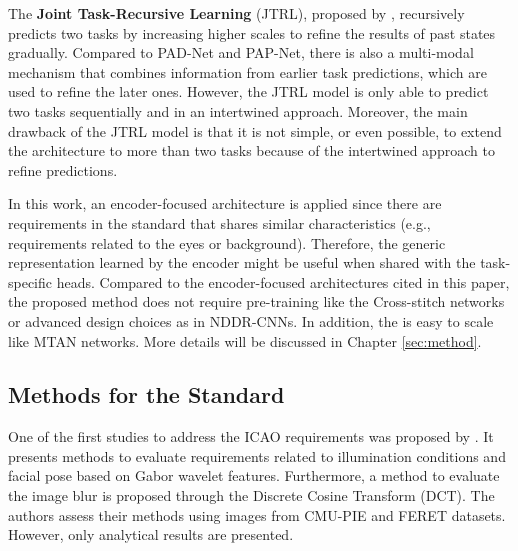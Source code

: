 The \textbf{Joint Task-Recursive Learning} (JTRL), proposed by \cite{zhang2018joint}, recursively predicts two tasks by increasing higher scales to refine the results of past states gradually. Compared to PAD-Net and PAP-Net, there is also a multi-modal mechanism that combines information from earlier task predictions, which are used to refine the later ones. However, the JTRL model is only able to predict two tasks sequentially and in an intertwined approach. Moreover, the main drawback of the JTRL model is that it is not simple, or even possible, to extend the architecture to more than two tasks because of the intertwined approach to refine predictions.

In this work, an encoder-focused architecture is applied since there are requirements in the \icao standard that shares similar characteristics (e.g., requirements related to the eyes or background). Therefore, the generic representation learned by the encoder might be useful when shared with the task-specific heads. Compared to the encoder-focused architectures cited in this paper, the proposed method does not require pre-training like the Cross-stitch networks or advanced design choices as in NDDR-CNNs. In addition, the \methodname is easy to scale like MTAN networks. More details will be discussed in Chapter \ref{sec:method}.

\subsection{Methods for the \icao Standard}

One of the first studies to address the ICAO requirements was proposed by \citet{sang2009face}. It presents methods to evaluate requirements related to illumination conditions and facial pose based on Gabor wavelet features. Furthermore, a method to evaluate the image blur is proposed through the Discrete Cosine Transform (DCT). The authors assess their methods using images from CMU-PIE and FERET datasets. However, only analytical results are presented.

